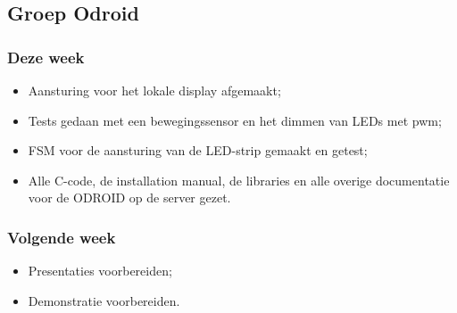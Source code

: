 \subsection*{Groep Odroid}
\subsubsection*{Deze week}

\begin{itemize}
\item Aansturing voor het lokale display afgemaakt;
\item Tests gedaan met een bewegingssensor en het dimmen van LEDs met pwm;
\item FSM voor de aansturing van de LED-strip gemaakt en getest;
\item Alle C-code, de installation manual, de libraries en alle overige documentatie voor de ODROID op de server gezet.
\end{itemize}

\subsubsection*{Volgende week}
\begin{itemize}
\item Presentaties voorbereiden;
\item Demonstratie voorbereiden.
\end{itemize}